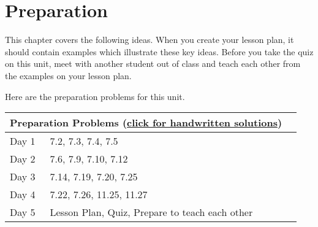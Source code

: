 \section{Preparation}

\noindent
This chapter covers the following ideas. When you create your lesson plan, it should contain examples which illustrate these key ideas. Before you take the quiz on this unit, meet with another student out of class and teach each other from the examples on your lesson plan. 



Here are the preparation problems for this unit.

\begin{center}
\begin{tabular}{ll|l}
\multicolumn{2}{c}{Preparation Problems (\href{http://ilearn.byui.edu/bbcswebdav/institution/Physical\_Sci\_Eng/Mathematics/Personal\%20Folders/WoodruffB/341/7-Inner-Products-Preparation-Solutions.pdf}{click for handwritten solutions})}
\\
\hline\hline
Day 1& 7.2, 7.3, 7.4, 7.5
\\ \hline
Day 2& 7.6, 7.9, 7.10, 7.12
\\ \hline
Day 3& 7.14, 7.19, 7.20, 7.25
\\ \hline
Day 4& 7.22, 7.26, 11.25, 11.27
\\ \hline
Day 5&
Lesson Plan,
Quiz, Prepare to teach each other
&
\\ \hline
\end{tabular}
\end{center}
